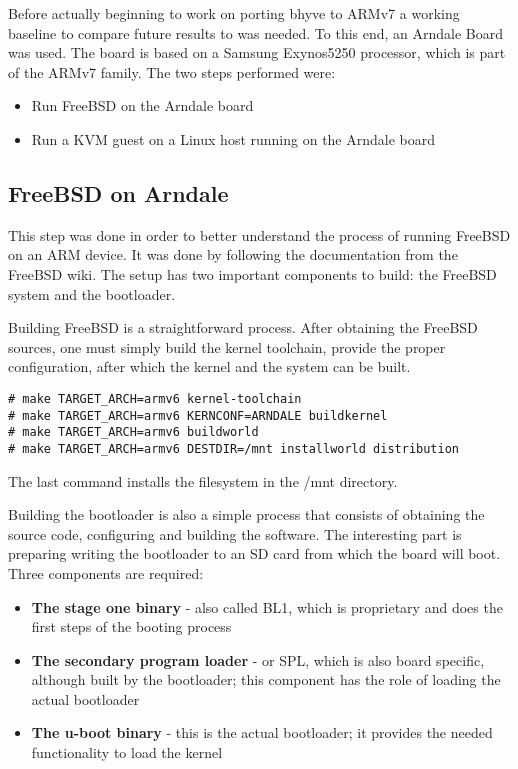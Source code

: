 
Before actually beginning to work on porting bhyve to ARMv7 a working baseline to compare future results to was needed. To this end, an Arndale Board was used. The board is based on a Samsung Exynos5250 processor, which is part of the ARMv7 family.
The two steps performed were:
\begin{itemize}
\item
Run FreeBSD on the Arndale board
\item
Run a KVM guest on a Linux host running on the Arndale board
\end{itemize}

\subsection{FreeBSD on Arndale}
\label{subsec:bsd-arndale}

This step was done in order to better understand the process of running FreeBSD on an ARM device. It was done by following the documentation from the FreeBSD wiki\cite{arndale}.
The setup has two important components to build: the FreeBSD system and the bootloader.

Building FreeBSD is a straightforward process. After obtaining the FreeBSD sources, one must simply build the kernel toolchain, provide the proper configuration, after which the kernel and the system can be built.

\begin{lstlisting}[frame=bottom, basicstyle=\footnotesize\ttfamily]
# make TARGET_ARCH=armv6 kernel-toolchain
# make TARGET_ARCH=armv6 KERNCONF=ARNDALE buildkernel
# make TARGET_ARCH=armv6 buildworld
# make TARGET_ARCH=armv6 DESTDIR=/mnt installworld distribution
\end{lstlisting}

The last command installs the filesystem in the /mnt directory.

Building the bootloader is also a simple process that consists of obtaining the source code, configuring and building the software.
The interesting part is preparing writing the bootloader to an SD card from which the board will boot. Three components are required:
\begin{itemize}
\item
\textbf{The stage one binary} - also called BL1, which is proprietary and does the first steps of the booting process
\item
\textbf{The secondary program loader} - or SPL, which is also board specific, although built by the bootloader; this component has the role of loading the actual bootloader
\item
\textbf{The u-boot binary} - this is the actual bootloader; it provides the needed functionality to load the kernel
\end{itemize}

